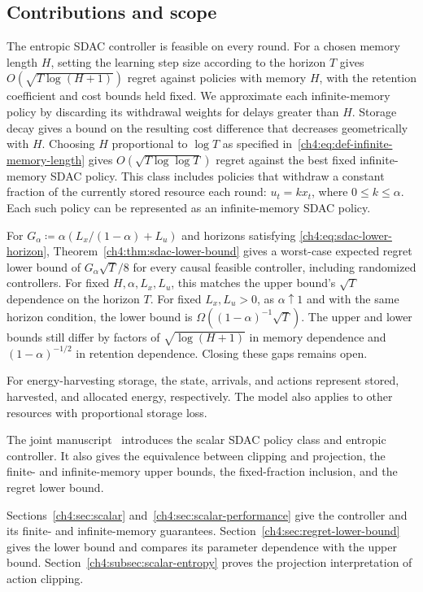 \subsection{Contributions and scope}

The entropic SDAC controller is feasible on every round. For a chosen memory
length $H$, setting the learning step size according to the horizon $T$ gives
$O(\sqrt{T\log(H+1)})$ regret against policies with memory $H$, with the
retention coefficient and cost bounds held fixed. We approximate
each infinite-memory policy by discarding its withdrawal weights for delays
greater than $H$. Storage decay gives a bound on the resulting cost difference
that decreases geometrically with $H$. Choosing $H$ proportional to $\log T$
as specified in~\eqref{ch4:eq:def-infinite-memory-length} gives
$O(\sqrt{T\log\log T})$ regret against the best fixed infinite-memory SDAC
policy. This class includes policies that withdraw a constant fraction of
the currently stored resource each round: $u_t=kx_t$, where $0\le k\le\alpha$.
Each such policy can be represented as an infinite-memory SDAC policy.

For $G_\alpha\coloneqq\alpha(L_x/(1-\alpha)+L_u)$ and horizons satisfying
\eqref{ch4:eq:sdac-lower-horizon},
Theorem~\ref{ch4:thm:sdac-lower-bound} gives a worst-case expected
regret lower bound of $G_\alpha\sqrt{T}/8$ for every causal feasible
controller, including randomized controllers.
For fixed $H,\alpha,L_x,L_u$, this matches the upper bound's
$\sqrt{T}$ dependence on the horizon $T$. For fixed $L_x,L_u>0$, as
$\alpha\uparrow1$ and with the same horizon condition, the lower bound is
$\Omega((1-\alpha)^{-1}\sqrt T)$.
The upper and lower bounds still differ by factors of
$\sqrt{\log(H+1)}$ in memory dependence and $(1-\alpha)^{-1/2}$ in
retention dependence. Closing these gaps remains open.

For energy-harvesting storage, the state, arrivals, and actions represent
stored, harvested, and allocated energy, respectively. The model also
applies to other resources with proportional storage loss.

The joint manuscript~\cite{asgari2026sdac} introduces the scalar SDAC policy
class and entropic controller. It also gives the equivalence
between clipping and projection, the finite- and infinite-memory upper
bounds, the fixed-fraction inclusion, and the regret lower bound.

Sections~\ref{ch4:sec:scalar} and~\ref{ch4:sec:scalar-performance}
give the controller and its finite- and infinite-memory guarantees.
Section~\ref{ch4:sec:regret-lower-bound} gives the lower bound and compares
its parameter dependence with the upper bound.
Section~\ref{ch4:subsec:scalar-entropy} proves the projection interpretation of action clipping.

